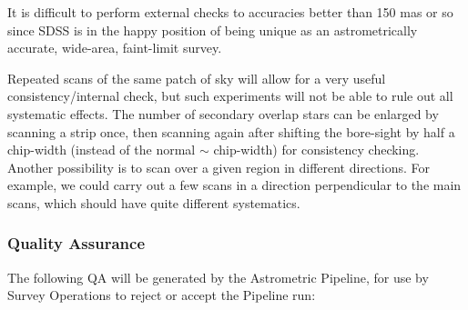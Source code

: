 It is difficult to perform external checks to accuracies better than
150 mas or so since SDSS is in the happy position of being unique as
an astrometrically accurate, wide-area, faint-limit survey.

Repeated scans of the same patch of sky will allow for a very useful
consistency/internal check, but such experiments will not be able to
rule out all systematic effects. The number of secondary overlap stars can
be enlarged by scanning a strip once, then scanning again after shifting
the bore-sight by half a chip-width (instead of the normal $\sim$
chip-width) for consistency checking.  Another possibility is to scan
over a given region in different directions.  For example, we could
carry out a few scans in a direction perpendicular to the main scans,
which should have quite different systematics. 

\subsubsection{Quality Assurance}
The following QA will be generated by the Astrometric Pipeline, for use
by Survey Operations to reject or accept the Pipeline run: 

